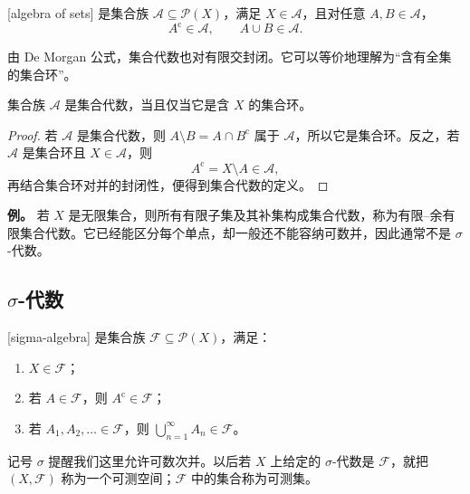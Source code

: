 \begin{definition}
\label{b1:def:set-algebra}
[algebra of sets] 是集合族 \(\mathcal A\subseteq\mathcal P(X)\)，满足 \(X\in\mathcal A\)，且对任意 \(A,B\in\mathcal A\)，
\[
A^{\mathrm c}\in\mathcal A,
\qquad
A\cup B\in\mathcal A.
\]
\end{definition}

由 De Morgan 公式，集合代数也对有限交封闭。它可以等价地理解为“含有全集的集合环”。

\begin{proposition}
\label{b1:prop:algebra-ring}
集合族 \(\mathcal A\) 是集合代数，当且仅当它是含 \(X\) 的集合环。
\end{proposition}
\begin{proof}
若 \(\mathcal A\) 是集合代数，则 \(A\setminus B=A\cap B^{\mathrm c}\) 属于 \(\mathcal A\)，所以它是集合环。反之，若 \(\mathcal A\) 是集合环且 \(X\in\mathcal A\)，则
\[
A^{\mathrm c}=X\setminus A\in\mathcal A,
\]
再结合集合环对并的封闭性，便得到集合代数的定义。
\end{proof}

\begin{remark}
\label{b1:rem:finite-cofinite-algebra}
\textbf{例。} 若 \(X\) 是无限集合，则所有有限子集及其补集构成集合代数，称为有限--余有限集合代数。它已经能区分每个单点，却一般还不能容纳可数并，因此通常不是 \(\sigma\)-代数。
\end{remark}

\subsection{\texorpdfstring{\(\sigma\)}{σ}-代数}
\label{b1:subsec:010103}

\begin{definition}
\label{b1:def:sigma-algebra}
[sigma-algebra] 是集合族 \(\mathcal F\subseteq\mathcal P(X)\)，满足：
\begin{enumerate}
  \item \(X\in\mathcal F\)；
  \item 若 \(A\in\mathcal F\)，则 \(A^{\mathrm c}\in\mathcal F\)；
  \item 若 \(A_1,A_2,\ldots\in\mathcal F\)，则 \(\bigcup_{n=1}^{\infty}A_n\in\mathcal F\)。
\end{enumerate}
\end{definition}

记号 \(\sigma\) 提醒我们这里允许可数次并。以后若 \(X\) 上给定的 \(\sigma\)-代数是 \(\mathcal F\)，就把 \((X,\mathcal F)\) 称为一个可测空间；\(\mathcal F\) 中的集合称为可测集。

